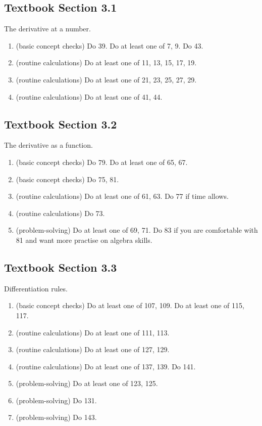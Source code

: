 \documentclass[./main.tex]{subfiles}
\begin{document}
\subsection*{Textbook Section 3.1}

The derivative at a number. 
\begin{enumerate}
  \item(basic concept checks) Do 39. Do at least one of 7, 9. Do 43.
  \item(routine calculations) Do at least one of 11, 13, 15, 17, 19.
  \item(routine calculations) Do at least one of 21, 23, 25, 27, 29.
  \item(routine calculations) Do at least one of 41, 44.
\end{enumerate}

\subsection*{Textbook Section 3.2}

The derivative as a function.
\begin{enumerate}
  \item (basic concept checks) Do 79. Do at least one of 65, 67. 
  \item (basic concept checks) Do 75, 81.
  \item (routine calculations) Do at least one of 61, 63. Do 77 if time allows.
  \item (routine calculations) Do 73.
  \item (problem-solving) Do at least one of 69, 71. Do 83 if you are comfortable with 81 and want more practise on algebra skills.
\end{enumerate}

\clearpage
\subsection*{Textbook Section 3.3}

Differentiation rules.
\begin{enumerate}
  \item (basic concept checks) Do at least one of 107, 109. Do at least one of 115, 117.
  \item (routine calculations) Do at least one of 111, 113. 
  \item (routine calculations) Do at least one of 127, 129.
  \item (routine calculations) Do at least one of 137, 139. Do 141.
  \item (problem-solving) Do at least one of 123, 125.
  \item (problem-solving) Do 131.
  \item (problem-solving) Do 143. 
\end{enumerate}
\end{document}
